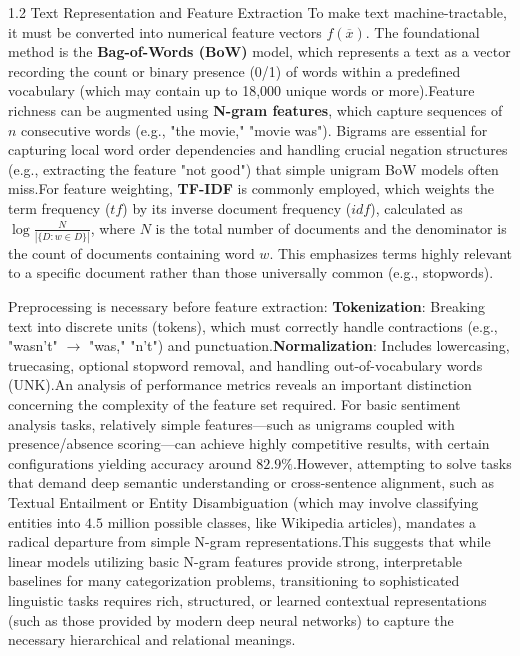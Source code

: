 \documentclass{article}
\begin{document}
1.2 Text Representation and Feature Extraction
To make text machine-tractable, it must be converted into numerical feature vectors $f(\overline{x})$. The foundational method is the \textbf{Bag-of-Words (BoW)} model, which represents a text as a vector recording the count or binary presence (0/1) of words within a predefined vocabulary (which may contain up to 18,000 unique words or more).\footnotemark[1]
Feature richness can be augmented using \textbf{N-gram features}, which capture sequences of $n$ consecutive words (e.g., "the movie," "movie was"). Bigrams are essential for capturing local word order dependencies and handling crucial negation structures (e.g., extracting the feature "not good") that simple unigram BoW models often miss.\footnotemark[1] For feature weighting, \textbf{TF-IDF} is commonly employed, which weights the term frequency ($tf$) by its inverse document frequency ($idf$), calculated as $\log \frac{N}{|\{D: w \in D\}|}$, where $N$ is the total number of documents and the denominator is the count of documents containing word $w$. This emphasizes terms highly relevant to a specific document rather than those universally common (e.g., stopwords).\footnotemark[1]

Preprocessing is necessary before feature extraction:
\textbf{Tokenization}: Breaking text into discrete units (tokens), which must correctly handle contractions (e.g., "wasn't" $\rightarrow$ "was," "n't") and punctuation.\footnotemark[1]
\textbf{Normalization}: Includes lowercasing, truecasing, optional stopword removal, and handling out-of-vocabulary words (UNK).\footnotemark[1]
An analysis of performance metrics reveals an important distinction concerning the complexity of the feature set required. For basic sentiment analysis tasks, relatively simple features—such as unigrams coupled with presence/absence scoring—can achieve highly competitive results, with certain configurations yielding accuracy around $82.9\%$.\footnotemark[1] However, attempting to solve tasks that demand deep semantic understanding or cross-sentence alignment, such as Textual Entailment or Entity Disambiguation (which may involve classifying entities into $4.5$ million possible classes, like Wikipedia articles), mandates a radical departure from simple N-gram representations.\footnotemark[1] This suggests that while linear models utilizing basic N-gram features provide strong, interpretable baselines for many categorization problems, transitioning to sophisticated linguistic tasks requires rich, structured, or learned contextual representations (such as those provided by modern deep neural networks) to capture the necessary hierarchical and relational meanings.\footnotemark[1]
\end{document}
